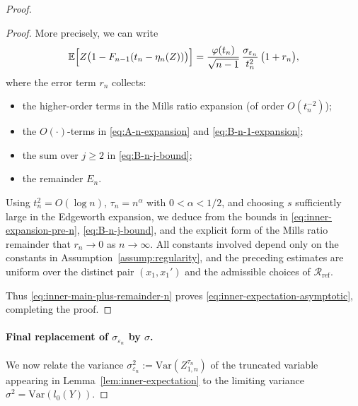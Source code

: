 \documentclass{article}
\theoremstyle{plain}
\theoremstyle{definition}
\begin{document}
\begin{proof}
\begin{proof}
More precisely, we can write
\begin{equation}
  \label{eq:inner-main-plus-remainder-n}
  \mathbb E\Bigl[
    Z\bigl(1-F_{n-1}(t_n-\eta_n(Z))\bigr)
  \Bigr]
  = \frac{\varphi(t_n)}{\sqrt{n-1}}\,
    \frac{\sigma_{\varepsilon_n}}{t_n^2}\,
    \bigl(1+r_n\bigr),
\end{equation}
where the error term $r_n$ collects:
\begin{itemize}
  \item[(a)] the higher-order terms in the Mills ratio expansion
    (of order $O(t_n^{-2})$);
  \item[(b)] the $O(\cdot)$-terms in \eqref{eq:A-n-expansion}
    and \eqref{eq:B-n-1-expansion};
  \item[(c)] the sum over $j\ge2$ in \eqref{eq:B-n-j-bound};
  \item[(d)] the remainder $E_n$.
\end{itemize}

Using $t_n^2=O(\log n)$, $\tau_n=n^\alpha$ with $0<\alpha<1/2$, and
choosing $s$ sufficiently large in the Edgeworth expansion, we deduce
from the bounds in \eqref{eq:inner-expansion-pre-n},
\eqref{eq:B-n-j-bound}, and the explicit form of the Mills ratio
remainder that $r_n\to0$ as $n\to\infty$. All constants involved depend
only on the constants in Assumption~\ref{assump:regularity}, and the
preceding estimates are uniform over the distinct pair $(x_1,x_1')$
and the admissible choices of $\mathcal R_{\mathrm{ref}}$.

Thus \eqref{eq:inner-main-plus-remainder-n} proves
\eqref{eq:inner-expectation-asymptotic}, completing the proof.
\end{proof}



\paragraph{Final replacement of $\sigma_{\varepsilon_n}$ by $\sigma$.}
We now relate the variance $\sigma_{\varepsilon_n}^2 := \mathrm{Var}(Z_{1,n}^{\tau_n})$ of the truncated variable appearing in Lemma~\ref{lem:inner-expectation} to the limiting variance $\sigma^2 = \mathrm{Var}(l_0(Y))$.


\end{proof}
\end{document}
